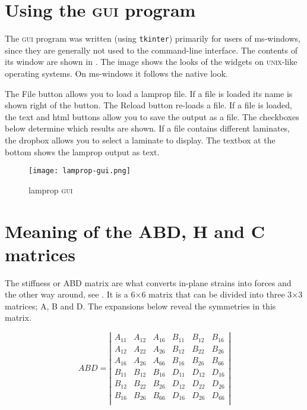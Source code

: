 \documentclass[a4paper,landscape,oneside,11pt,twocolumn]{memoir}
\begin{document}
\section{Using the \textsc{gui} program} %

The \textsc{gui} program was written (using \texttt{tkinter}) primarily for
users of ms-windows, since they are generally not used to the command-line
interface. The contents of its window are shown in . The
image shows the looks of the widgets on \textsc{unix}-like operating systems.
On ms-windows it follows the native look.

The \textsf{File} button allows you to load a lamprop file. If a file is
loaded its name is shown right of the button. The \textsf{Reload} button
re-loads a file.
If a file is loaded, the \textsf{text} and \textsf{html} buttons allow you
to save the output as a file.
The checkboxes below determine which results are shown. If
a file contains different laminates, the dropbox allows you to select
a laminate to display. The textbox at the bottom shows the lamprop output as
text.

\begin{figure}[!htbp]
  \centerline{\texttt{[image: lamprop-gui.png]}}
  \caption{\label{fig:lamprop-gui}lamprop \textsc{gui}}
\end{figure}



\section{Meaning of the ABD, H and C matrices} %

The stiffness or ABD matrix are what converts
in-plane strains into forces and the other way around, see
.  It is a 6×6 matrix that can be divided
into three 3×3 matrices; A, B and D.
The expansions below reveal the symmetries in this matrix.

\[
    ABD = \left|\begin{array}{cccccc}
        A_{11} & A_{12} & A_{16} & B_{11} & B_{12} & B_{16}\\
        A_{12} & A_{22} & A_{26} & B_{12} & B_{22} & B_{26}\\
        A_{16} & A_{26} & A_{66} & B_{16} & B_{26} & B_{66}\\
        B_{11} & B_{12} & B_{16} & D_{11} & D_{12} & D_{16}\\
        B_{12} & B_{22} & B_{26} & D_{12} & D_{22} & D_{26}\\
        B_{16} & B_{26} & B_{66} & D_{16} & D_{26} & D_{66}\\
    \end{array}\right|
\]
\end{document}
